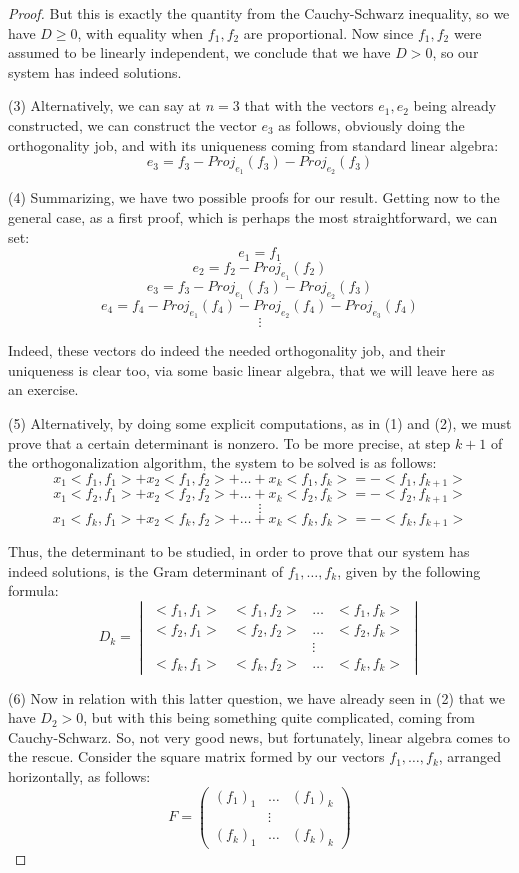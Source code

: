 \documentclass[12pt]{amsbook}
\begin{document}
\begin{proof}
But this is exactly the quantity from the Cauchy-Schwarz inequality, so we have $D\geq0$, with equality when $f_1,f_2$ are proportional. Now since $f_1,f_2$ were assumed to be linearly independent, we conclude that we have $D>0$, so our system has indeed solutions.

\medskip

(3) Alternatively, we can say at $n=3$ that with the vectors $e_1,e_2$ being already constructed, we can construct the vector $e_3$ as follows, obviously doing the orthogonality job, and with its uniqueness coming from standard linear algebra:
$$e_3=f_3-Proj_{e_1}(f_3)-Proj_{e_2}(f_3)$$

(4) Summarizing, we have two possible proofs for our result. Getting now to the general case, as a first proof, which is perhaps the most straightforward, we can set:
$$e_1=f_1$$
$$e_2=f_2-Proj_{e_1}(f_2)$$
$$e_3=f_3-Proj_{e_1}(f_3)-Proj_{e_2}(f_3)$$
$$e_4=f_4-Proj_{e_1}(f_4)-Proj_{e_2}(f_4)-Proj_{e_3}(f_4)$$
$$\vdots$$

Indeed, these vectors do indeed the needed orthogonality job, and their uniqueness is clear too, via some basic linear algebra, that we will leave here as an exercise.

\medskip

(5) Alternatively, by doing some explicit computations, as in (1) and (2), we must prove that a certain determinant is nonzero. To be more precise, at step $k+1$ of the orthogonalization algorithm, the system to be solved is as follows:
$$x_1<f_1,f_1>+x_2<f_1,f_2>+\ldots+x_k<f_1,f_k>=-<f_1,f_{k+1}>$$
$$x_1<f_2,f_1>+x_2<f_2,f_2>+\ldots+x_k<f_2,f_k>=-<f_2,f_{k+1}>$$
$$\vdots$$
$$x_1<f_k,f_1>+x_2<f_k,f_2>+\ldots+x_k<f_k,f_k>=-<f_k,f_{k+1}>$$

Thus, the determinant to be studied, in order to prove that our system has indeed solutions, is the Gram determinant of $f_1,\ldots,f_k$, given by the following formula:
$$D_k=\begin{vmatrix}
<f_1,f_1>&<f_1,f_2>&\ldots&<f_1,f_k>\\
<f_2,f_1>&<f_2,f_2>&\ldots&<f_2,f_k>\\
&&\vdots\\
<f_k,f_1>&<f_k,f_2>&\ldots&<f_k,f_k>
\end{vmatrix}$$

(6) Now in relation with this latter question, we have already seen in (2) that we have $D_2>0$, but with this being something quite complicated, coming from Cauchy-Schwarz. So, not very good news, but fortunately, linear algebra comes to the rescue. Consider the square matrix formed by our vectors $f_1,\ldots,f_k$, arranged horizontally, as follows:
$$F=\begin{pmatrix}
(f_1)_1&\ldots&(f_1)_k\\
&\vdots\\
(f_k)_1&\ldots&(f_k)_k
\end{pmatrix}$$


\end{proof}
\end{document}
